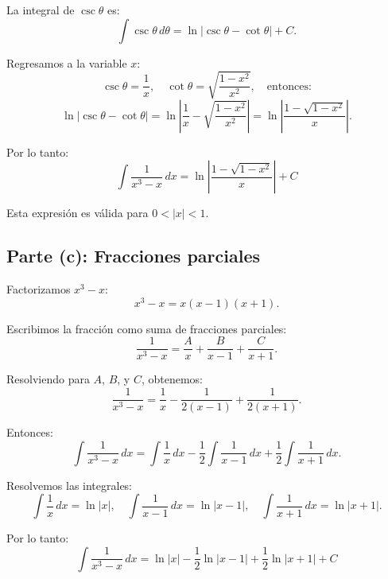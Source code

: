 La integral de \( \csc\theta \) es:
\[
\int \csc\theta \, d\theta = \ln|\csc\theta - \cot\theta| + C.
\]

Regresamos a la variable \( x \):
\[
\csc\theta = \frac{1}{x}, \quad \cot\theta = \sqrt{\frac{1-x^2}{x^2}}, \quad \text{entonces:}
\]
\[
\ln|\csc\theta - \cot\theta| = \ln\left|\frac{1}{x} - \sqrt{\frac{1-x^2}{x^2}}\right| = \ln\left|\frac{1 - \sqrt{1-x^2}}{x}\right|.
\]

Por lo tanto:
\[\boxed{
\int \frac{1}{x^3 - x} \, dx = \ln\left|\frac{1 - \sqrt{1-x^2}}{x}\right| + C}
\]

Esta expresión es válida para \( 0 < |x| < 1 \).

\subsection*{Parte (c): Fracciones parciales}

Factorizamos \( x^3 - x \):
\[
x^3 - x = x(x-1)(x+1).
\]

Escribimos la fracción como suma de fracciones parciales:
\[
\frac{1}{x^3 - x} = \frac{A}{x} + \frac{B}{x-1} + \frac{C}{x+1}.
\]

Resolviendo para \( A \), \( B \), y \( C \), obtenemos:
\[
\frac{1}{x^3 - x} = \frac{1}{x} - \frac{1}{2(x-1)} + \frac{1}{2(x+1)}.
\]

Entonces:
\[
\int \frac{1}{x^3 - x} \, dx = \int \frac{1}{x} \, dx - \frac{1}{2} \int \frac{1}{x-1} \, dx + \frac{1}{2} \int \frac{1}{x+1} \, dx.
\]

Resolvemos las integrales:
\[
\int \frac{1}{x} \, dx = \ln|x|, \quad \int \frac{1}{x-1} \, dx = \ln|x-1|, \quad \int \frac{1}{x+1} \, dx = \ln|x+1|.
\]

Por lo tanto:
\[\boxed{
\int \frac{1}{x^3 - x} \, dx = \ln|x| - \frac{1}{2} \ln|x-1| + \frac{1}{2} \ln|x+1| + C}
\]
